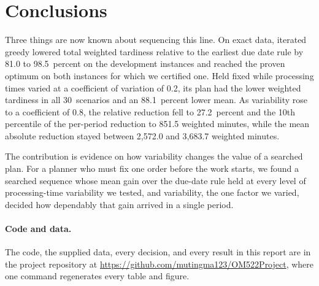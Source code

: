 \section{Conclusions}\label{sec:conclusions}

\sumpara Three things are now known about sequencing this line. \sumparaend
\fin On exact data, iterated greedy lowered total weighted tardiness relative to the earliest due date rule by 81.0 to 98.5~percent on the development instances and reached the proven optimum on both instances for which we certified one. \fine
\fin Held fixed while processing times varied at a coefficient of variation of 0.2, its plan had the lower weighted tardiness in all 30~scenarios and an 88.1~percent lower mean. \fine
\fin As variability rose to a coefficient of 0.8, the relative reduction fell to 27.2~percent and the 10th percentile of the per-period reduction to 851.5 weighted minutes, while the mean absolute reduction stayed between 2,572.0 and 3,683.7 weighted minutes. \fine

\sumpara The contribution is evidence on how variability changes the value of a searched plan. \sumparaend
\fin For a planner who must fix one order before the work starts, we found a searched sequence whose mean gain over the due-date rule held at every level of processing-time variability we tested, and variability, the one factor we varied, decided how dependably that gain arrived in a single period. \fine

\paragraph{Code and data.}
\fin The code, the supplied data, every decision, and every result in this report are in the project repository at \url{https://github.com/mutingma123/OM522Project}, where one command regenerates every table and figure. \fine
